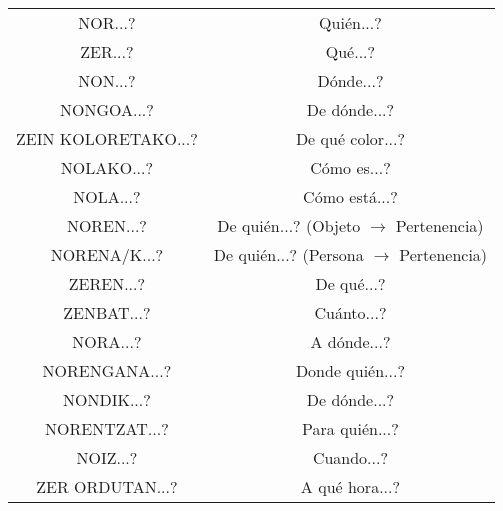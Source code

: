 \documentclass[12pt, a4paper, landscape]{article}
\begin{document}
\begin{table}[h]
\begin{center}
\begin{tabular}{||cc}
NOR...? & Quién...? \\
ZER...? & Qué...? \\
NON...? & Dónde...? \\
NONGOA...? & De dónde...? \\
ZEIN KOLORETAKO...? & De qué color...? \\
NOLAKO...? & Cómo es...? \\
NOLA...? & Cómo está...? \\
NOREN...? & De quién...? (Objeto $\to$ Pertenencia)\\
NORENA/K...? & De quién...? (Persona $\to$ Pertenencia) \\
ZEREN...? & De qué...? \\
ZENBAT...? & Cuánto...? \\
NORA...? & A dónde...? \\
NORENGANA...? & Donde quién...? \\
NONDIK...? & De dónde...? \\
NORENTZAT...? & Para quién...? \\
NOIZ...? & Cuando...? \\
ZER ORDUTAN...? & A qué hora...?
\end{tabular}
\end{center}
\end{table}
\end{document}
